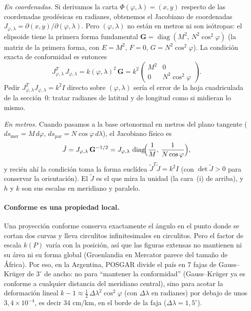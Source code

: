 \begin{atencion}[¿Sobre qué Jacobiano pedimos \(J^TJ=k^2I\)? Coordenadas \((\varphi,\lambda)\) vs.\ metros en el plano tangente]
\emph{En coordenadas.} Si derivamos la carta \(\Phi(\varphi,\lambda)=(x,y)\) respecto de las
coordenadas geodésicas en radianes, obtenemos el Jacobiano de coordenadas
\(J_{\varphi,\lambda}=\partial(x,y)/\partial(\varphi,\lambda)\). Pero \((\varphi,\lambda)\) no
están en metros ni son isótropas: el elipsoide tiene la primera forma fundamental
\(\mathbf G=\operatorname{diag}(M^2,\,N^2\cos^2\varphi)\) (la matriz de la primera forma, con
\(E=M^2\), \(F=0\), \(G=N^2\cos^2\varphi\)). La condición exacta de conformidad es
entonces
\[
  J_{\varphi,\lambda}^T\,J_{\varphi,\lambda}=k(\varphi,\lambda)^2\,\mathbf G
  =k^2\begin{pmatrix}M^2&0\\0&N^2\cos^2\varphi\end{pmatrix}.
\]
Pedir \(J_{\varphi,\lambda}^TJ_{\varphi,\lambda}=k^2I\) directo sobre \((\varphi,\lambda)\)
sería el error de la hoja cuadriculada de la sección~0: tratar radianes de latitud y de
longitud como si midieran lo mismo.

\emph{En metros.} Cuando pasamos a la base ortonormal en metros del plano tangente
(\(ds_{\text{mer}}=M\,d\varphi\), \(ds_{\text{par}}=N\cos\varphi\,d\lambda\)), el Jacobiano
físico es
\[
  \tilde J=J_{\varphi,\lambda}\,\mathbf G^{-1/2}
  =J_{\varphi,\lambda}\,\operatorname{diag}\!\Bigl(\frac1M,\,\frac1{N\cos\varphi}\Bigr),
\]
y recién ahí la condición toma la forma euclídea \(\tilde J^T\tilde J=k^2I\) (con
\(\det\tilde J>0\) para conservar la orientación). El \(\tilde J\) es el que mira la unidad
(la cara~(i) de arriba), y \(h\) y \(k\) son sus escalas en meridiano y paralelo.
\end{atencion}

\paragraph{Conforme es una propiedad local.} Una proyección conforme conserva exactamente
el ángulo en el punto donde se cortan dos curvas y lleva circulitos infinitesimales en
circulitos. Pero el factor de escala \(k(P)\) varía con la posición, así que las figuras
extensas no mantienen ni su área ni su forma global (Groenlandia en Mercator parece del
tamaño de África). Por eso, en la Argentina, POSGAR divide el país en 7 fajas de
Gauss--Krüger de \(3^\circ\) de ancho: no para ``mantener la conformidad'' (Gauss--Krüger
ya es conforme a cualquier distancia del meridiano central), sino para acotar la
deformación lineal \(k-1\approx\tfrac12\,\Delta\lambda^2\cos^2\varphi\) (con \(\Delta\lambda\)
en radianes) por debajo de unos \(3{,}4\times10^{-4}\), es decir \(34\) cm/km, en el borde
de la faja (\(\Delta\lambda=1{,}5^\circ\)).

